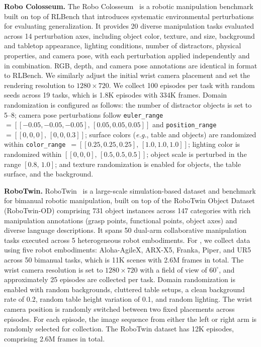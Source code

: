 \textbf{Robo Colosseum.}
The Robo Colosseum~\citep{pumacay2024colosseum} is a robotic manipulation benchmark built on top of RLBench that introduces systematic environmental perturbations for evaluating generalization.
%
It provides 20 diverse manipulation tasks evaluated across 14 perturbation axes, including object color, texture, and size, background and tabletop appearance, lighting conditions, number of distractors, physical properties, and camera pose, with each perturbation applied independently and in combination.
%
RGB, depth, and camera pose annotations are identical in format to RLBench.
%
We similarly adjust the initial wrist camera placement and set the rendering resolution 
to $1280 \times 720$. 
%
We collect 100 episodes per task with random seeds across 19 tasks, which is 1.8K episodes with 334K frames.
%
Domain randomization is configured as follows: the number of distractor objects is set to 5--8; camera pose perturbations follow  \texttt{euler\_range}~$= [[-0.05,-0.05,-0.05],\,[0.05,0.05,0.05]]$ and \texttt{position\_range}~$= [[0,0,0],\,[0,0,0.3]]$; surface colors (\emph{e.g.}, table and objects) are randomized within \texttt{color\_range}~$= [[0.25,0.25,0.25],\,[1.0,1.0,1.0]]$; lighting color is randomized within $[[0,0,0],\,[0.5,0.5,0.5]]$; object scale is perturbed in the range $[0.8,\,1.0]$; and texture randomization is enabled for objects, the table surface, and the background.

\textbf{RoboTwin.}
RoboTwin~\citep{chen2025robotwin} is a large-scale simulation-based dataset and benchmark for bimanual robotic manipulation, built on top of the RoboTwin Object Dataset (RoboTwin-OD) comprising 731 object instances across 147 categories with rich manipulation annotations (grasp points, functional points, object axes) and diverse language descriptions.
%
It spans 50 dual-arm collaborative manipulation tasks executed across 5 heterogeneous robot embodiments.
%
For \dataset, we collect data using five robot embodiments: Aloha-AgileX, ARX-X5, Franka, Piper, and UR5 across 50 bimanual tasks, which is 11K scenes with 2.6M frames in total.
%
The wrist camera resolution is set to $1280 \times 720$ with a field of view of $60^\circ$, and approximately 25 episodes are collected per task. 
%
Domain randomization is enabled with random backgrounds, cluttered table setups, a clean background rate of 0.2, random table height variation of 0.1, and random lighting. 
%
The wrist camera position is randomly switched between two fixed placements across episodes. For each episode, the image sequence from either the left or right arm is randomly selected for collection.
%
The RoboTwin dataset has 12K episodes, comprising 2.6M frames in total.

